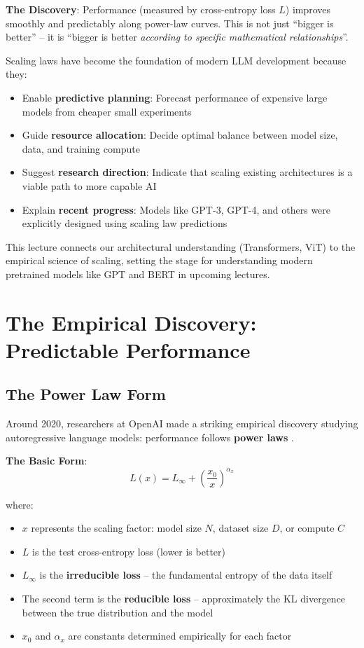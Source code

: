 \documentclass{article}
\begin{document}
\textbf{The Discovery}: Performance (measured by cross-entropy loss $L$) improves smoothly and predictably along power-law curves. This is not just ``bigger is better'' -- it is ``bigger is better \textit{according to specific mathematical relationships}''.

\begin{tcolorbox}[colback=yellow!5!white, colframe=orange!50!black, title=Why This Matters]
Scaling laws have become the foundation of modern LLM development because they:
\begin{itemize}
\item Enable \textbf{predictive planning}: Forecast performance of expensive large models from cheaper small experiments
\item Guide \textbf{resource allocation}: Decide optimal balance between model size, data, and training compute
\item Suggest \textbf{research direction}: Indicate that scaling existing architectures is a viable path to more capable AI
\item Explain \textbf{recent progress}: Models like GPT-3, GPT-4, and others were explicitly designed using scaling law predictions
\end{itemize}
\end{tcolorbox}

This lecture connects our architectural understanding (Transformers, ViT) to the empirical science of scaling, setting the stage for understanding modern pretrained models like GPT and BERT in upcoming lectures.

\section{The Empirical Discovery: Predictable Performance}

\subsection{The Power Law Form}

Around 2020, researchers at OpenAI made a striking empirical discovery studying autoregressive language models: performance follows \textbf{power laws} \cite{kaplan2020scaling}.

\textbf{The Basic Form}:
\[
L(x) = L_{\infty} + \left(\frac{x_0}{x}\right)^{\alpha_x}
\]

where:
\begin{itemize}
\item $x$ represents the scaling factor: model size $N$, dataset size $D$, or compute $C$
\item $L$ is the test cross-entropy loss (lower is better)
\item $L_{\infty}$ is the \textbf{irreducible loss} -- the fundamental entropy of the data itself
\item The second term is the \textbf{reducible loss} -- approximately the KL divergence between the true distribution and the model
\item $x_0$ and $\alpha_x$ are constants determined empirically for each factor
\end{itemize}
\end{document}
